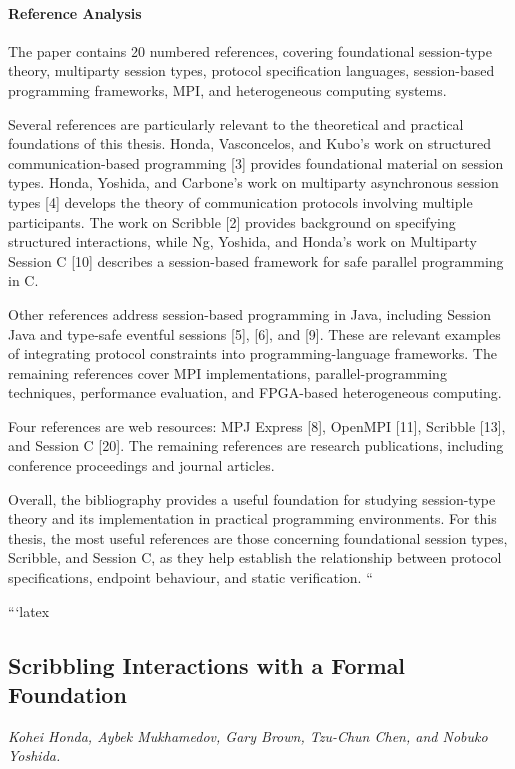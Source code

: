 \paragraph{Reference Analysis}
The paper contains 20 numbered references, covering foundational session-type theory, multiparty session types, protocol specification languages, session-based programming frameworks, MPI, and heterogeneous computing systems.

Several references are particularly relevant to the theoretical and practical foundations of this thesis. Honda, Vasconcelos, and Kubo's work on structured communication-based programming [3] provides foundational material on session types. Honda, Yoshida, and Carbone's work on multiparty asynchronous session types [4] develops the theory of communication protocols involving multiple participants. The work on Scribble [2] provides background on specifying structured interactions, while Ng, Yoshida, and Honda's work on Multiparty Session C [10] describes a session-based framework for safe parallel programming in C.

Other references address session-based programming in Java, including Session Java and type-safe eventful sessions [5], [6], and [9]. These are relevant examples of integrating protocol constraints into programming-language frameworks. The remaining references cover MPI implementations, parallel-programming techniques, performance evaluation, and FPGA-based heterogeneous computing.

Four references are web resources: MPJ Express [8], OpenMPI [11], Scribble [13], and Session C [20]. The remaining references are research publications, including conference proceedings and journal articles.

Overall, the bibliography provides a useful foundation for studying session-type theory and its implementation in practical programming environments. For this thesis, the most useful references are those concerning foundational session types, Scribble, and Session C, as they help establish the relationship between protocol specifications, endpoint behaviour, and static verification.
``


```latex
\subsection{Scribbling Interactions with a Formal Foundation}
\textit{Kohei Honda, Aybek Mukhamedov, Gary Brown, Tzu-Chun Chen, and Nobuko Yoshida.}

